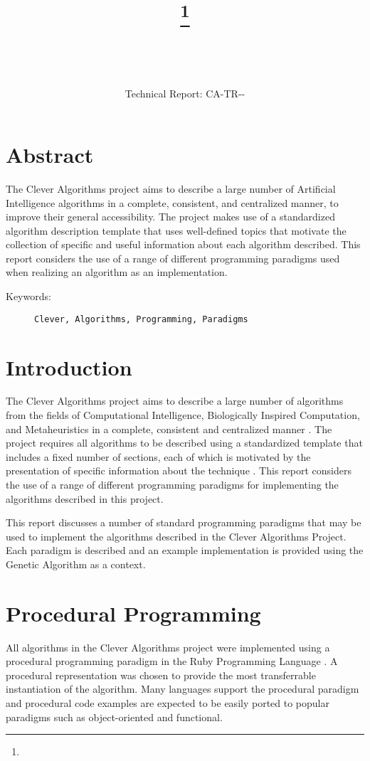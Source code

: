 \documentclass[a4paper, 11pt]{article}
\title{{\myreporttitle}\footnote{\myreportlicense}}
\author{\myreportauthor\\{\myreportemail}\\\small\myreportproject}
\date{\myreportfulldate\\{\small{Technical Report: CA-TR-{\myreportdate}-\myreportversion}}}
\begin{document}
\maketitle

\section*{Abstract} 
The Clever Algorithms project aims to describe a large number of Artificial Intelligence algorithms in a complete, consistent, and centralized manner, to improve their general accessibility. 
The project makes use of a standardized algorithm description template that uses well-defined topics that motivate the collection of specific and useful information about each algorithm described.
This report considers the use of a range of different programming paradigms used when realizing an algorithm as an implementation.

\begin{description}
	\item[Keywords:] {\small\texttt{Clever, Algorithms, Programming, Paradigms}}
\end{description} 

\section{Introduction}
\label{sec:introduction}
The Clever Algorithms project aims to describe a large number of algorithms from the fields of Computational Intelligence, Biologically Inspired Computation, and Metaheuristics in a complete, consistent and centralized manner \cite{Brownlee2010}.
The project requires all algorithms to be described using a standardized template that includes a fixed number of sections, each of which is motivated by the presentation of specific information about the technique \cite{Brownlee2010a}.
This report considers the use of a range of different programming paradigms for implementing the algorithms described in this project.

This report discusses a number of standard programming paradigms that may be used to implement the algorithms described in the Clever Algorithms Project. Each paradigm is described and an example implementation is provided using the Genetic Algorithm as a context.

\section{Procedural Programming}
All algorithms in the Clever Algorithms project were implemented using a procedural programming paradigm in the Ruby Programming Language \cite{Brownlee2010au}. A procedural representation was chosen to provide the most transferrable instantiation of the algorithm. Many languages support the procedural paradigm and procedural code examples are expected to be easily ported to popular paradigms such as object-oriented and functional.
\end{document}
